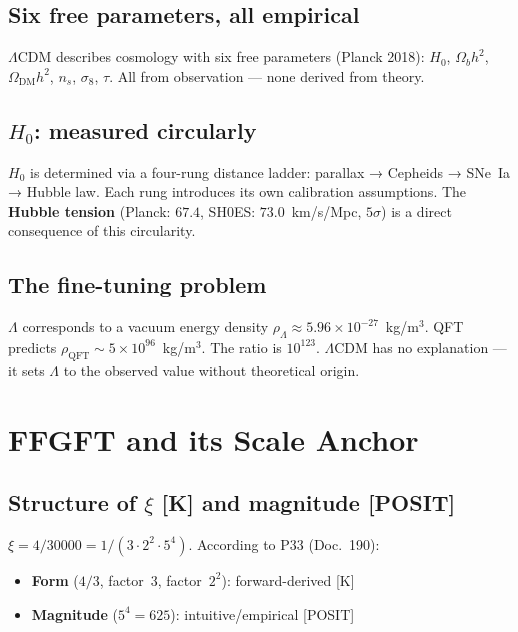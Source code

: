 \section{Six free parameters, all empirical}

$\Lambda$CDM describes cosmology with six free parameters (Planck 2018):
$H_0$, $\Omega_b h^2$, $\Omega_\text{DM} h^2$, $n_s$, $\sigma_8$,
$\tau$. All from observation — none derived from theory.

\section{$H_0$: measured circularly}

$H_0$ is determined via a four-rung distance ladder:
parallax → Cepheids → SNe~Ia → Hubble law. Each rung introduces its
own calibration assumptions. The \textbf{Hubble tension} (Planck:
$67.4$, SH0ES: $73.0$~km/s/Mpc, $5\sigma$) is a direct consequence
of this circularity.

\section{The fine-tuning problem}

$\Lambda$ corresponds to a vacuum energy density
$\rho_\Lambda \approx 5.96\times10^{-27}$~kg/m$^3$.
QFT predicts $\rho_\text{QFT} \sim 5\times10^{96}$~kg/m$^3$.
The ratio is $10^{123}$. $\Lambda$CDM has no explanation —
it sets $\Lambda$ to the observed value without theoretical origin.

\chapter{FFGFT and its Scale Anchor}

\section{Structure of $\xi$ [K] and magnitude [POSIT]}

$\xi = 4/30000 = 1/(3\cdot2^2\cdot5^4)$.
According to P33 (Doc.~190):

\begin{itemize}
  \item \textbf{Form} ($4/3$, factor~3, factor~$2^2$):
        forward-derived [K]
  \item \textbf{Magnitude} ($5^4 = 625$): intuitive/empirical [POSIT]
\end{itemize}

